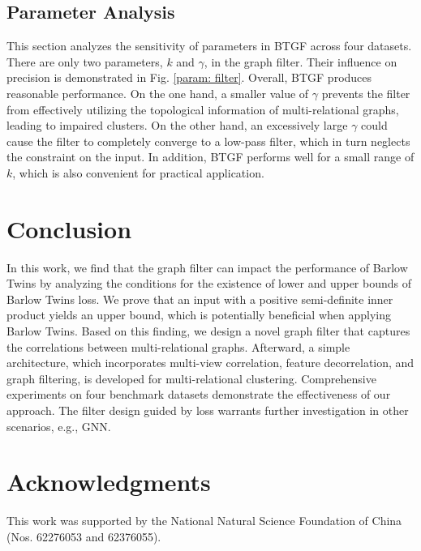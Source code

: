 \documentclass[letterpaper]{article} %
\begin{document}
\subsection{Parameter Analysis}

This section analyzes the sensitivity of parameters in BTGF across four datasets. There are only two parameters, $k$ and $\gamma$, in the graph filter. Their influence on precision is demonstrated in Fig. \ref{param: filter}. Overall, BTGF produces reasonable performance. On the one hand, a smaller value of $\gamma$ prevents the filter from effectively utilizing the topological information of multi-relational graphs, leading to impaired clusters. On the other hand, an excessively large $\gamma$ could cause the filter to completely converge to a low-pass filter, which in turn neglects the constraint on the input. In addition, BTGF performs well for a small range of $k$, which is also convenient for practical application. %


\section{Conclusion}
In this work, we find that the graph filter can impact the performance of Barlow Twins by analyzing the conditions for the existence of lower and upper bounds of Barlow Twins loss. We prove that an input with a positive semi-definite inner product yields an upper bound, which is potentially beneficial when applying Barlow Twins. Based on this finding, we design a novel graph filter that captures the correlations between multi-relational graphs. Afterward, a simple architecture, which incorporates multi-view correlation, feature decorrelation, and graph filtering, is developed for multi-relational clustering. Comprehensive experiments on four benchmark datasets demonstrate the effectiveness of our approach. The filter design guided by loss warrants further investigation in other scenarios, e.g., GNN.


\section{Acknowledgments}
This work was supported by the National Natural Science
Foundation of China (Nos. 62276053 and 62376055).


\end{document}
